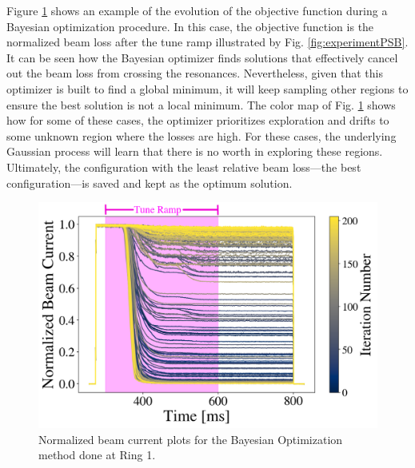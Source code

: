 Figure \ref{fig:ibo} shows an example of the evolution of the objective function during a Bayesian optimization procedure. In this case, the objective function is the normalized beam loss after the tune ramp illustrated by Fig. \ref{fig:experimentPSB}. It can be seen how the Bayesian optimizer finds solutions that effectively cancel out the beam loss from crossing the resonances. Nevertheless, given that this optimizer is built to find a global minimum, it will keep sampling other regions to ensure the best solution is not a local minimum. The color map of Fig. \ref{fig:ibo} shows how for some of these cases, the optimizer prioritizes exploration and drifts to some unknown region where the losses are high. For these cases, the underlying Gaussian process will learn that there is no worth in exploring these regions. Ultimately, the configuration with the least relative beam loss---the best configuration---is saved and kept as the optimum solution.

\begin{figure}[H]
    \centering
    \includegraphics[width=\linewidth]{chapter5/i1_bo_commented.png}
    \caption{Normalized beam current plots for the Bayesian Optimization method done at Ring 1.}
    \label{fig:ibo}
\end{figure}

